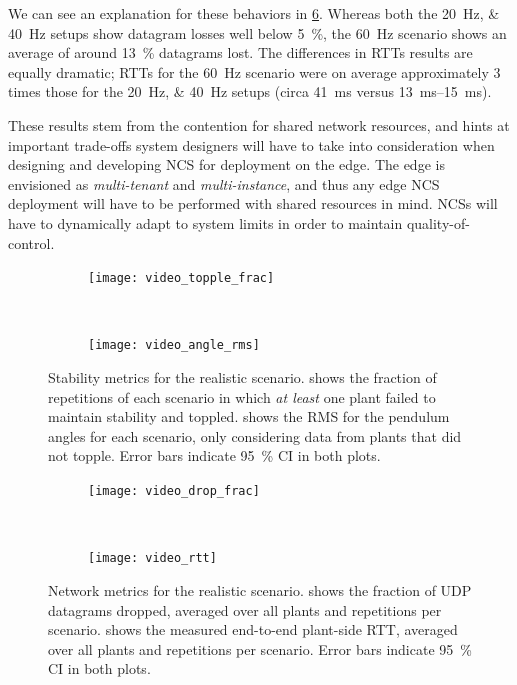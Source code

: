 We can see an explanation for these behaviors in \cref{fig:video:network}.
Whereas both the \SIlist{20;40}{\hertz} setups show datagram losses well below \SI{5}{\percent}, the \SI{60}{\hertz} scenario shows an average of around \SI{13}{\percent} datagrams lost.
The differences in \acp{RTT} results are equally dramatic; \acp{RTT} for the \SI{60}{\hertz} scenario were on average approximately \num{3} times those for the \SIlist{20;40}{\hertz} setups (circa \SI{41}{\milli\second} versus \SIrange[range-phrase=--]{13}{15}{\milli\second}).

These results stem from the contention for shared network resources, and hints at important trade-offs system designers will have to take into consideration when designing and developing \acl{NCS} for deployment on the edge.
The edge is envisioned as \emph{multi-tenant} and \emph{multi-instance}, and thus any edge \ac{NCS} deployment will have to be performed with shared resources in mind.
\acp{NCS} will have to dynamically adapt to system limits in order to maintain quality-of-control.

\begin{figure}
    \centering
    \begin{subfigure}[h]{\columnwidth}
        \centering
        \texttt{[image: video\_topple\_frac]}
        \caption{}\label{fig:video:toppled}
    \end{subfigure}\\%
    \begin{subfigure}[h]{\columnwidth}
        \centering
        \texttt{[image: video\_angle\_rms]}
        \caption{}\label{fig:video:rms}
    \end{subfigure}%
    \caption{
        Stability metrics for the realistic scenario.
         shows the fraction of repetitions of each scenario in which \emph{at least} one plant failed to maintain stability and toppled.
         shows the \ac{RMS} for the pendulum angles for each scenario, only considering data from plants that did not topple.
        Error bars indicate \SI{95}{\percent} \ac{CI} in both plots.
    }\label{fig:video:stability}
\end{figure}

\begin{figure}
    \centering
    \begin{subfigure}[h]{\columnwidth}
        \centering
        \texttt{[image: video\_drop\_frac]}
        \caption{}\label{fig:video:drop}
    \end{subfigure}\\%
    \begin{subfigure}[h]{\columnwidth}
        \centering
        \texttt{[image: video\_rtt]}
        \caption{}\label{fig:video:rtt}
    \end{subfigure}%
    \caption{
        Network metrics for the realistic scenario.
         shows the fraction of \ac{UDP} datagrams dropped, averaged over all plants and repetitions per scenario.
         shows the measured end-to-end plant-side \ac{RTT}, averaged over all plants and repetitions per scenario.
        Error bars indicate \SI{95}{\percent} \ac{CI} in both plots.
    }\label{fig:video:network}
\end{figure}